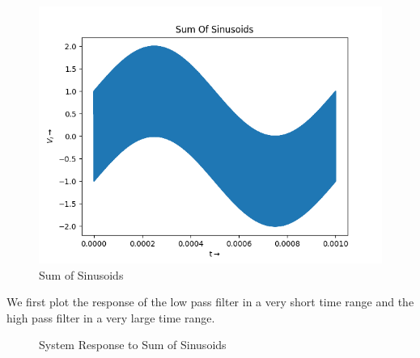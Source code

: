 \documentclass{article}
\begin{document}
\begin{figure}[!tbh]
    \centering
    \includegraphics[scale=0.5]{plots/Sum Of Sinusoids.png}   
    \caption{Sum of Sinusoids}
\end{figure}

We first plot the response of the low pass filter in a very short time range and the high pass filter in a very large time range.


\begin{figure}%
    \centering
    \qquad
    \caption{System Response to Sum of Sinusoids}%
    \label{Figure 5}
\end{figure}
\end{document}

